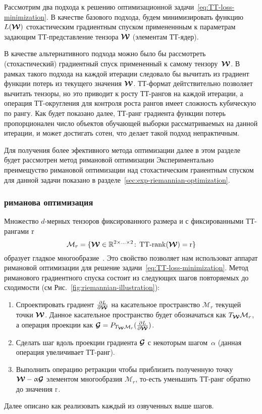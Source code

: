 Рассмотрим два подхода к решению оптимизационной задачи~\eqref{eq:TT-loss-minimization}.
В качестве базового подхода, будем минимизировать функцию $L(\boldsymbol{\mathcal{W}})$ стохастическим градиентным спуском примененнным к параметрам задающим ТТ-представление тензора $\boldsymbol{\mathcal{W}}$ (элементам ТТ-ядер).

В качестве альтернативного подхода можно было бы рассмотреть (стохастический) градиентный спуск примененный к самому тензору~$\boldsymbol{\mathcal{W}}$. В рамках такого подхода на каждой итерации следовало бы вычитать из градиент функции потерь из текущего значения $\boldsymbol{\mathcal{W}}$. ТТ-формат дейтствительно позволяет вычитать тензоры, но это приводит к росту ТТ-рангов на каждой итерации, а операция ТТ-округления для контроля роста рангов имеет сложность кубическую по рангу. Как будет показано далее, ТТ-ранг градиента функции потерь пропорционален число объектов обучающей выборки рассматриваемых на данной итерации, и может достигать сотен, что делает такой подход непрактичным.

Для получения более эфективного метода оптимизации далее в этом разделе будет рассмотрен метод римановой оптимизации 
Экспериментально преимещуство римановой оптимизации над стохастическим граиентным спуском для данной задачи показано в разделе~\ref{sec:exp-riemannian-optimization}.

\subsubsection{риманова оптимизация\label{sec:exm-riemannian-optimization}}
Множество $d$-мерных тензоров фиксированного размера и с фиксированными ТТ-рангами $\operatorname{r}$
\begin{equation*}
\mathcal{M}_r = \{\boldsymbol{\mathcal{W}} \in \mathbb{R}^{2 \times  \ldots \times 2}\!:\, \operatorname{TT-rank}(\boldsymbol{\mathcal{W}})=\operatorname{r}\}
\end{equation*}
образует гладкое многообразие~\cite{holtz2012manifolds}.
Это свойство позволяет нам использоват аппарат римановой оптимизации для решение задачи~\eqref{eq:TT-loss-minimization}.
Метод риманового градиентного спуска состоит из следующих шагов повторяемых до сходимости (см Рис.~\ref{fig:riemannian-illustration}):
\begin{enumerate}
\item Спроектировать градиент $\frac{\partial L}{\partial \boldsymbol{\mathcal{W}}}$ на касательное пространство $\mathcal{M}_r$ текущей точки $\boldsymbol{\mathcal{W}}$. Данное касательное пространство будет обозначаться как $T_{\boldsymbol{\mathcal{W}}} \mathcal{M}_r$, а операция проекции как $\boldsymbol{\mathcal{G}} = P_{T_{\boldsymbol{\mathcal{W}}} \mathcal{M}_r}(\frac{\partial L}{\partial \boldsymbol{\mathcal{W}}})$.
\item Сделать шаг вдоль проекции градиента $\boldsymbol{\mathcal{G}}$ с некоторым шагом~$\alpha$ (данная операция увеличивает ТТ-ранг).
\item Выполнить операцию ретракции чтобы приблизить полученную точку $\boldsymbol{\mathcal{W}} - \upalpha \boldsymbol{\mathcal{G}}$  элементом многообразия $\mathcal{M}_r$, то-есть уменьшить ТТ-ранг обратно до значения $\operatorname{r}$.
\end{enumerate}
Далее описано как реализовать каждый из озвученных выше шагов.


